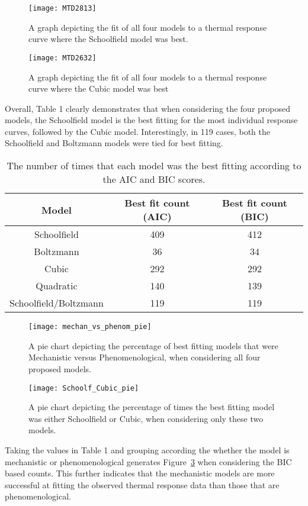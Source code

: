 \documentclass[11pt]{article}
\begin{document}
\begin{center}
\begin{figure}
\texttt{[image: MTD2813]}
\caption{A graph depicting the fit of all four models to a thermal response curve where the Schoolfield model was best.}
\label{fig: MTD2813}
\end{figure}
\begin{figure}
\texttt{[image: MTD2632]}
\caption{A graph depicting the fit of all four models to a thermal response curve where the Cubic model was best}
\label{fig: MTD2632}
\end{figure}
\end{center}
Overall, Table 1 clearly demonstrates that when considering the four proposed models, the Schoolfield model is the best fitting for the most individual response curves, followed by the Cubic model. Interestingly, in 119 cases, both the Schoolfield and Boltzmann models were tied for best fitting.
\begin{center}
\begin{table}
\begin{tabular}{|c|c|c|}
\hline
Model & Best fit count (AIC) & Best fit count (BIC)\\
\hline
Schoolfield & 409 & 412\\
Boltzmann & 36 & 34\\
Cubic & 292 & 292\\
Quadratic & 140 & 139\\
Schoolfield/Boltzmann & 119 & 119\\
\hline
\end{tabular}
\caption{The number of times that each model was the best fitting according to the AIC and BIC scores.}
\end{table}
\begin{figure}
\texttt{[image: mechan\_vs\_phenom\_pie]}
\caption{A pie chart depicting the percentage of best fitting models that were Mechanistic versus Phenomenological, when considering all four proposed models.}
\label{fig: mechanpie}
\end{figure}
\begin{figure}
\texttt{[image: Schoolf\_Cubic\_pie]}
\caption{A pie chart depicting the percentage of times the best fitting model was either Schoolfield or Cubic, when considering only these two models.}
\label{fig: Schoolf_pie}
\end{figure}
\end{center}
Taking the values in Table 1 and grouping according the whether the model is mechanistic or phenomenological generates Figure~\ref{fig: mechanpie} when considering the BIC based counts. This further indicates that the mechanistic models are more successful at fitting the observed thermal response data than those that are phenomenological. 
\end{document}
